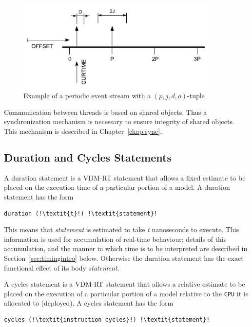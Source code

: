 \documentclass{overturerepchap}
\begin{document}
\begin{figure}[!htb]
\begin{center}
\includegraphics[width=4in]{figures/PeriodJitterDelayOffset.PNG}
\end{center}
\caption{Example of a periodic event stream with a $(p,j,d,o)$-tuple\label{fig:perioddef}}
\end{figure}

Communication between threads is based on shared objects. Thus a
synchronization mechanism is necessary to ensure integrity of shared
objects. This mechanism is described in Chapter~\ref{chap:sync}.

\subsection{Duration and Cycles Statements}

A duration statement is a VDM-RT statement that allows a fixed estimate to
be placed on the execution time of a particular portion of a model. A
duration statement has the form

\begin{lstlisting}
duration (!\textit{t}!) !\textit{statement}!
\end{lstlisting}

This means that \emph{statement} is estimated to take \emph{t} nanoseconds 
to execute. This information is used for accumulation of
real-time behaviour; details of this accumulation, and the manner in
which time is to be interpreted are described in
Section~\ref{sec:timingintro} below.  Otherwise the duration statement
has the exact functional effect of its body \textit{statement}.

A cycles statement is a VDM-RT statement that allows a relative
estimate to be placed on the execution of a particular portion of a
model relative to the \texttt{CPU} it is allocated to (deployed). A cycles
statement has the form

\begin{lstlisting}
cycles (!\textit{instruction cycles}!) !\textit{statement}!
\end{lstlisting}
\end{document}
